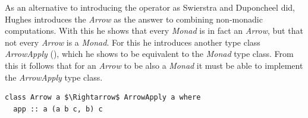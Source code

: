 As an alternative to introducing the \code{(<*>)} operator as Swierstra and Duponcheel did, Hughes introduces the \textit{Arrow} as the answer to combining non-monadic computations. With this he shows that every \textit{Monad} is in fact an \textit{Arrow}, but that not every \textit{Arrow} is a \textit{Monad}. For this he introduces another type class \textit{ArrowApply} (), which he shows to be equivalent to the \textit{Monad} type class. From this it follows that for an \textit{Arrow} to be also a \textit{Monad} it must be able to implement the \textit{ArrowApply} type class.

\begin{lstlisting}[style=HaskellStyle, caption={\textit{ArrowApply} type class}, label={lst:arrow-apply}, captionpos=b, numbers=none]
class Arrow a $\Rightarrow$ ArrowApply a where
  app :: a (a b c, b) c
\end{lstlisting}

